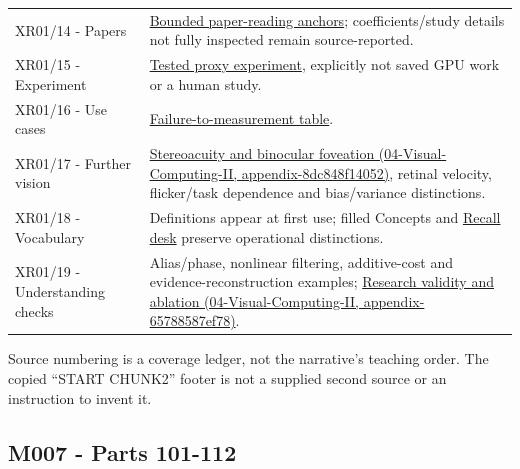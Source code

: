 {\begin{longtable}[]{@{}
  >{\raggedright\arraybackslash}p{}
  >{\raggedright\arraybackslash}p{}@{}}
XR01/14 - Papers & \href{Continuous\%20Notes/University\%20-\%20Worlds,\%20Images\%20and\%20Inference\%20-\%20Graphics,\%20Vision\%20and\%20Photography\#Read\%20research\%20as\%20a\%20chain\%20of\%20questions,\%20methods\%20and\%20bounded\%20conclusions/}{Bounded paper-reading anchors}; coefficients/study details not fully inspected remain source-reported. \\
XR01/15 - Experiment & \href{Continuous\%20Notes/University\%20-\%20Worlds,\%20Images\%20and\%20Inference\%20-\%20Graphics,\%20Vision\%20and\%20Photography\#Complete\%20numerical\%20and\%20image-space\%20laboratory/}{Tested proxy experiment}, explicitly not saved GPU work or a human study. \\
XR01/16 - Use cases & \href{Continuous\%20Notes/University\%20-\%20Worlds,\%20Images\%20and\%20Inference\%20-\%20Graphics,\%20Vision\%20and\%20Photography\#Diagnose\%20a\%20symptom\%20by\%20the\%20quantity\%20that\%20failed/}{Failure-to-measurement table}. \\
XR01/17 - Further vision & \href{../04-Visual-Computing-II/main.pdf\#nameddest=appendix-8dc848f14052}{Stereoacuity and binocular foveation (04-Visual-Computing-II, appendix-8dc848f14052)}, retinal velocity, flicker/task dependence and bias/variance distinctions. \\
XR01/18 - Vocabulary & Definitions appear at first use; filled Concepts and \href{Continuous\%20Notes/University\%20-\%20Worlds,\%20Images\%20and\%20Inference\%20-\%20Graphics,\%20Vision\%20and\%20Photography\#Teach\%20the\%20distinctions\%20from\%20a\%20blank\%20board/}{Recall desk} preserve operational distinctions. \\
XR01/19 - Understanding checks & Alias/phase, nonlinear filtering, additive-cost and evidence-reconstruction examples; \href{../04-Visual-Computing-II/main.pdf\#nameddest=appendix-65788587ef78}{Research validity and ablation (04-Visual-Computing-II, appendix-65788587ef78)}. \\
\end{longtable}
}

Source numbering is a coverage ledger, not the narrative's teaching order. The copied ``START CHUNK2'' footer is not a supplied second source or an instruction to invent it.

\subsection{M007 - Parts 101-112}\label{appendix-fd090d982a15-m007---parts-101-112}


